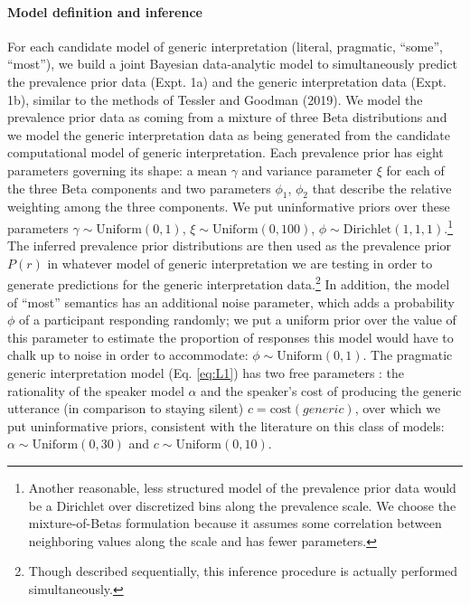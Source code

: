 \documentclass[floatsintext,doc]{apa6}
\let\oldparagraph\paragraph
\renewcommand{\paragraph}[1]{\oldparagraph{#1}\mbox{}}
\let\rmarkdownfootnote\footnote%
\def\footnote{\protect\rmarkdownfootnote}
\begin{document}
\hypertarget{model-definition-and-inference}{%
\paragraph{Model definition and inference}\label{model-definition-and-inference}}

For each candidate model of generic interpretation (literal, pragmatic, \enquote{some}, \enquote{most}), we build a joint Bayesian data-analytic model to simultaneously predict the prevalence prior data (Expt. 1a) and the generic interpretation data (Expt. 1b), similar to the methods of Tessler and Goodman (2019).
We model the prevalence prior data as coming from a mixture of three Beta distributions and we model the generic interpretation data as being generated from the candidate computational model of generic interpretation.
Each prevalence prior has eight parameters governing its shape: a mean \(\gamma\) and variance parameter \(\xi\) for each of the three Beta components and two parameters \(\phi_1\), \(\phi_2\) that describe the relative weighting among the three components.
We put uninformative priors over these parameters \(\gamma \sim \text{Uniform}(0, 1)\), \(\xi \sim \text{Uniform}(0, 100)\), \(\phi \sim \text{Dirichlet}(1,1,1)\).\footnote{Another reasonable, less structured model of the prevalence prior data would be a Dirichlet over discretized bins along the prevalence scale. We choose the mixture-of-Betas formulation because it assumes some correlation between neighboring values along the scale and has fewer parameters. }
The inferred prevalence prior distributions are then used as the prevalence prior \(P(r)\) in whatever model of generic interpretation we are testing in order to generate predictions for the generic interpretation data.\footnote{Though described sequentially, this inference procedure is actually performed simultaneously.}
In addition, the model of \enquote{most} semantics has an additional noise parameter, which adds a probability \(\phi\) of a participant responding randomly; we put a uniform prior over the value of this parameter to estimate the proportion of responses this model would have to chalk up to noise in order to accommodate: \(\phi \sim \text{Uniform}(0, 1)\).
The pragmatic generic interpretation model (Eq. \ref{eq:L1}) has two free parameters : the rationality of the speaker model \(\alpha\) and the speaker's cost of producing the generic utterance (in comparison to staying silent) \(c = \text{cost}(generic)\), over which we put uninformative priors, consistent with the literature on this class of models: \(\alpha \sim \text{Uniform}(0, 30)\) and \(c \sim \text{Uniform}(0, 10)\).
\end{document}
